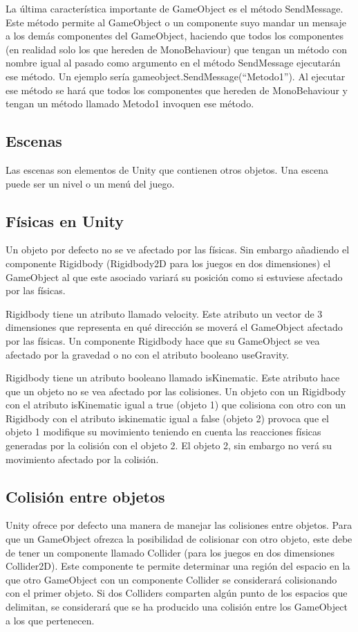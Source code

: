 La última característica importante de GameObject es el método SendMessage. Este método permite al GameObject o un componente suyo mandar un mensaje a los demás componentes del GameObject, haciendo que todos los componentes (en realidad solo los que hereden de MonoBehaviour) que tengan un método con nombre igual al pasado como argumento en el método SendMessage ejecutarán ese método. Un ejemplo sería gameobject.SendMessage(“Metodo1”). Al ejecutar ese método se hará que todos los componentes que hereden de MonoBehaviour y tengan un método llamado Metodo1 invoquen ese método.

\subsection{Escenas}
Las escenas son elementos de Unity que contienen otros objetos. Una escena puede ser un nivel o un menú del juego.

\subsection{Físicas en Unity}
Un objeto por defecto no se ve afectado por las físicas. Sin embargo añadiendo el componente Rigidbody (Rigidbody2D para los juegos en dos dimensiones) el GameObject al que este asociado variará su posición como si estuviese afectado por las físicas.

Rigidbody tiene un atributo llamado velocity. Este atributo un vector de 3 dimensiones que representa en qué dirección se moverá el GameObject afectado por las físicas. Un componente Rigidbody hace que su GameObject se vea afectado por la gravedad o no con el atributo booleano useGravity.

Rigidbody tiene un atributo booleano llamado isKinematic. Este atributo hace que un objeto no se vea afectado por las colisiones. Un objeto con un Rigidbody con el atributo isKinematic igual a true (objeto 1) que colisiona con otro con un Rigidbody con el atributo iskinematic igual a false (objeto 2) provoca que el objeto 1 modifique su movimiento teniendo en cuenta las reacciones físicas generadas por la colisión con el objeto 2. El objeto 2, sin embargo no verá su movimiento afectado por la colisión.

\subsection{Colisión entre objetos}
Unity ofrece por defecto una manera de manejar las colisiones entre objetos. Para que un GameObject ofrezca la posibilidad de colisionar con otro objeto, este debe de tener un componente llamado Collider (para los juegos en dos dimensiones Collider2D). Este componente te permite determinar una región del espacio en la que otro GameObject con un componente Collider se considerará colisionando con el primer objeto. Si dos Colliders comparten algún punto de los espacios que delimitan, se considerará que se ha producido una colisión entre los GameObject a los que pertenecen. 


